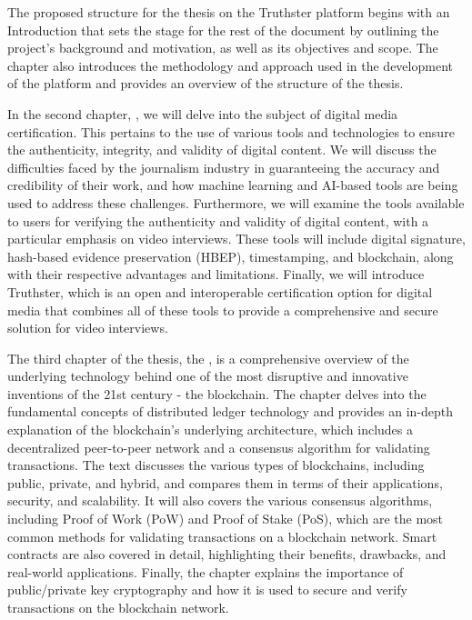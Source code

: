 \documentclass[target=mst,aauheader=]{thud}
\begin{document}
The proposed structure for the thesis on the Truthster platform begins with an Introduction that sets the stage for the rest of the document by outlining the project's background and motivation, as well as its objectives and scope. The chapter also introduces the methodology and approach used in the development of the platform and provides an overview of the structure of the thesis.\par
In the second chapter, \textbf{}, we will delve into the subject of digital media certification. This pertains to the use of various tools and technologies to ensure the authenticity, integrity, and validity of digital content. We will discuss the difficulties faced by the journalism industry in guaranteeing the accuracy and credibility of their work, and how machine learning and AI-based tools are being used to address these challenges. Furthermore, we will examine the tools available to users for verifying the authenticity and validity of digital content, with a particular emphasis on video interviews. These tools will include digital signature, hash-based evidence preservation (HBEP), timestamping, and blockchain, along with their respective advantages and limitations. Finally, we will introduce Truthster, which is an open and interoperable certification option for digital media that combines all of these tools to provide a comprehensive and secure solution for video interviews.\par
The third chapter of the thesis, the \textbf{}, is a comprehensive overview of the underlying technology behind one of the most disruptive and innovative inventions of the 21st century - the blockchain. The chapter delves into the fundamental concepts of distributed ledger technology and provides an in-depth explanation of the blockchain's underlying architecture, which includes a decentralized peer-to-peer network and a consensus algorithm for validating transactions. The text discusses the various types of blockchains, including public, private, and hybrid, and compares them in terms of their applications, security, and scalability. It will also covers the various consensus algorithms, including Proof of Work (PoW) and Proof of Stake (PoS), which are the most common methods for validating transactions on a blockchain network. Smart contracts are also covered in detail, highlighting their benefits, drawbacks, and real-world applications. Finally, the chapter explains the importance of public/private key cryptography and how it is used to secure and verify transactions on the blockchain network.\par
\end{document}
